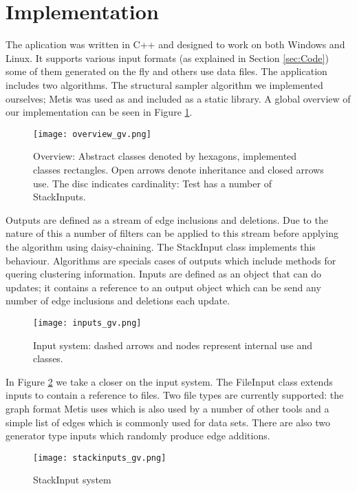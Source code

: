 \documentclass[a4paper]{article}
\begin{document}
\pagebreak
\section{Implementation}\label{sec:code_struct}
The aplication was written in C++ and designed to work on both Windows and Linux. It supports various input formats (as explained in Section \ref{sec:Code}) some of them generated on the fly and others use data files. The application includes two algorithms. The structural sampler algorithm we implemented ourselves; Metis was used as and included as a static library. A global overview of our implementation can be seen in Figure \ref{fig:overview}.
\begin{figure}[h]
\centering
\texttt{[image: overview\_gv.png]}
\caption{\label{fig:overview}Overview: Abstract classes denoted by hexagons, implemented classes rectangles. Open arrows denote inheritance and closed arrows use. The disc indicates cardinality: Test has a number of StackInputs.}
\end{figure}

Outputs are defined as a stream of edge inclusions and deletions. Due to the nature of this a number of filters can be applied to this stream before applying the algorithm using daisy-chaining. The StackInput class implements this behaviour. Algorithms are specials cases of outputs which include methods for quering clustering information. Inputs are defined as an object that can do updates; it contains a reference to an output object which can be send any number of edge inclusions and deletions each update.

\begin{figure}[h]
\centering
\texttt{[image: inputs\_gv.png]}
\caption{\label{fig:inputs}Input system: dashed arrows and nodes represent internal use and classes.}
\end{figure}

In Figure \ref{fig:inputs} we take a closer on the input system. The FileInput class extends inputs to contain a reference to files. Two file types are currently supported: the graph format Metis uses which is also used by a number of other tools and a simple list of edges which is commonly used for data sets. There are also two generator type inputs which randomly produce edge additions.

\begin{figure}[h]
\centering
\texttt{[image: stackinputs\_gv.png]}
\caption{\label{fig:stackinputs}StackInput system}
\end{figure}
\end{document}
